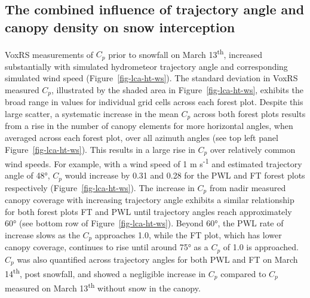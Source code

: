 \documentclass[
  letterpaper,
]{tex/uofsthesis-cs}
\begin{document}
\subsection{The combined influence of trajectory angle and canopy
density on snow
interception}\label{the-combined-influence-of-trajectory-angle-and-canopy-density-on-snow-interception}

VoxRS measurements of \(C_p\) prior to snowfall on March
13\textsuperscript{th}, increased substantially with simulated
hydrometeor trajectory angle and corresponding simulated wind speed
(Figure~\ref{fig-lca-ht-ws}). The standard deviation in VoxRS measured
\(C_p\), illustrated by the shaded area in Figure~\ref{fig-lca-ht-ws},
exhibits the broad range in values for individual grid cells across each
forest plot. Despite this large scatter, a systematic increase in the
mean \(C_p\) across both forest plots results from a rise in the number
of canopy elements for more horizontal angles, when averaged across each
forest plot, over all azimuth angles (see top left panel
Figure~\ref{fig-lca-ht-ws}). This results in a large rise in \(C_p\)
over relatively common wind speeds. For example, with a wind speed of 1
m s\textsuperscript{-1} and estimated trajectory angle of 48°, \(C_p\)
would increase by 0.31 and 0.28 for the PWL and FT forest plots
respectively (Figure~\ref{fig-lca-ht-ws}). The increase in \(C_p\) from
nadir measured canopy coverage with increasing trajectory angle exhibits
a similar relationship for both forest plots FT and PWL until trajectory
angles reach approximately 60° (see bottom row of
Figure~\ref{fig-lca-ht-ws}). Beyond 60°, the PWL rate of increase slows
as the \(C_p\) approaches 1.0, while the FT plot, which has lower canopy
coverage, continues to rise until around 75° as a \(C_p\) of 1.0 is
approached. \(C_p\) was also quantified across trajectory angles for
both PWL and FT on March 14\textsuperscript{th}, post snowfall, and
showed a negligible increase in \(C_p\) compared to \(C_p\) measured on
March 13\textsuperscript{th} without snow in the canopy.
\end{document}
